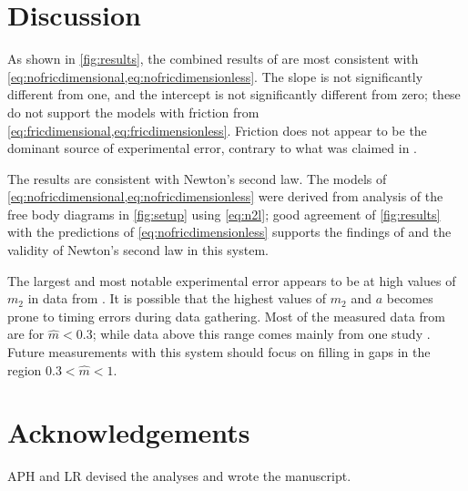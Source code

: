 \documentclass[reprint,amsmath,amssymb,aps,twoside]{revtex4-2}
\begin{document}
%





\section{Discussion}
As shown in \cref{fig:results}, the combined results of \cite{arenas-2024-testing,avalur-2024-verifying,canada-2024-experimental,kishore-2024-relationship,yagnyeshwaran-2024-verifying,govardhanen-2024-newtons,kedharnath-2024-examining,krasnopolsky-2024-testing,perle-2024-experimental} are most consistent with \cref{eq:nofricdimensional,eq:nofricdimensionless}. The slope is not significantly different from one, and the intercept is not significantly different from zero; these do not support the models with friction from \cref{eq:fricdimensional,eq:fricdimensionless}. Friction does not appear to be the dominant source of experimental error, contrary to what was claimed in \cite{arenas-2024-testing,avalur-2024-verifying,canada-2024-experimental,kishore-2024-relationship,yagnyeshwaran-2024-verifying,govardhanen-2024-newtons,kedharnath-2024-examining,krasnopolsky-2024-testing,perle-2024-experimental}.

The results are consistent with Newton's second law. The models of \cref{eq:nofricdimensional,eq:nofricdimensionless} were derived from analysis of the free body diagrams in \cref{fig:setup} using \cref{eq:n2l}; good agreement of \cref{fig:results} with the predictions of \cref{eq:nofricdimensionless} supports the findings of \cite{arenas-2024-testing,avalur-2024-verifying,canada-2024-experimental,kishore-2024-relationship,yagnyeshwaran-2024-verifying,govardhanen-2024-newtons,kedharnath-2024-examining,krasnopolsky-2024-testing,perle-2024-experimental} and the validity of Newton's second law in this system. 

The largest and most notable experimental error appears to be at high values of $m_2$ in data from \cite{krasnopolsky-2024-testing}. It is possible that the highest values of $m_2$ and $a$ becomes prone to timing errors during data gathering. Most of the measured data from \cite{arenas-2024-testing,avalur-2024-verifying,canada-2024-experimental,kishore-2024-relationship,yagnyeshwaran-2024-verifying,govardhanen-2024-newtons,kedharnath-2024-examining,krasnopolsky-2024-testing,perle-2024-experimental} are for $\hat{m}<0.3$; while data above this range comes mainly from one study \cite{krasnopolsky-2024-testing}. Future measurements with this system should focus on filling in gaps in the region $0.3<\hat{m}<1$.  

\section{Acknowledgements}
APH and LR devised the analyses and wrote the manuscript. 


\end{document}

